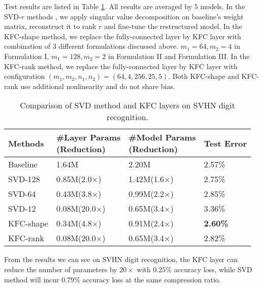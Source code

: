 \documentclass{article}
\begin{document}
Test results are listed in Table \ref{tab:svhn_approximation}. All results are averaged by $5$ models. In the SVD-$r$ methods
\cite{xue2013restructuring,denton2014exploiting}, we apply singular value decomposition on baseline's weight matrix, reconstruct it to rank $r$ and
fine-tune the restructured model. In the KFC-shape method, we replace the fully-connected layer by KFC layer with combination of $3$ different
formulations discussed above. $m_1 = 64, m_2 = 4$ in Formulation I, $m_1 = 128, m_2 = 2$ in Formulation II and Formulation III. In the KFC-rank
method, we replace the fully-connected layer by KFC layer with configuration $(m_1,m_2,n_1,n_2) = (64, 4, 256, 25, 5)$. Both KFC-shape and KFC-rank use additional nonlinearity and do not share bias.
\begin{table}[!ht] \centering \small
  \caption{Comparison of SVD method and KFC layers on SVHN digit recognition.}
\centering
\begin{tabular}{p{1.45cm} p{1.95cm} p{2cm} p{1.3cm}}
    \toprule \parbox[c]{\hsize}{Methods}  & \parbox[c]{1.95cm}{\#Layer Params\\(Reduction)} & \parbox[c]{2cm}{\#Model Params\\(Reduction)} & \parbox[c]{\hsize}{Test Error} \\
    \midrule Baseline & 1.64M & 2.20M & 2.57\% \\
    \midrule SVD-128 & 0.85M(2.0$\times$) & 1.42M(1.6$\times$) & 2.75\% \\
    \midrule SVD-64 & 0.43M(3.8$\times$) & 0.99M(2.2$\times$) & 2.85\% \\
    \midrule SVD-12 & 0.08M(20.0$\times$) & 0.65M(3.4$\times$) & 3.36\% \\
    \midrule KFC-shape & 0.34M(4.8$\times$) & 0.91M(2.4$\times$) & \textbf{2.60\%} \\
    \midrule KFC-rank & 0.08M(20.0$\times$) & 0.65M(3.4$\times$) & 2.82\% \\
\hline
\end{tabular}
\label{tab:svhn_approximation}
\end{table}

From the results we can see on SVHN digit recognition,
the KFC layer can reduce the number of parameters by $20\times$ with $0.25\%$ accuracy loss,
while SVD method will incur $0.79\%$ accuracy loss at the same compression ratio.
\end{document}
